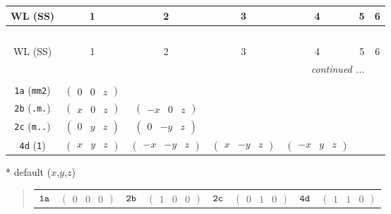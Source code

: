 \documentclass[fleqn,9pt,landscape]{jsarticle}
\begin{document}
\begin{center}
\renewcommand{\arraystretch}{1.2}
\begin{longtable}{ccccccc}
 \hline \hline
WL (SS) & 1 & 2 & 3 & 4 & 5 & 6 \\ \hline \endfirsthead

\multicolumn{6}{l}{\tablename\ \thetable{}} \\
 \hline \hline
WL (SS) & 1 & 2 & 3 & 4 & 5 & 6 \\ \hline \endhead

 \hline \hline
\multicolumn{6}{r}{\footnotesize\it continued ...} \\ \endfoot

 \hline \hline
\multicolumn{6}{r}{} \\ \endlastfoot

{\tt 1a} ({\tt mm2}) & $ \begin{pmatrix} 0 & 0 & z \end{pmatrix} $ & $  $ & $  $ & $  $ \\ \hline
{\tt 2b} ({\tt .m.}) & $ \begin{pmatrix} x & 0 & z \end{pmatrix} $ & $ \begin{pmatrix} - x & 0 & z \end{pmatrix} $ & $  $ & $  $ \\ \hline
{\tt 2c} ({\tt m..}) & $ \begin{pmatrix} 0 & y & z \end{pmatrix} $ & $ \begin{pmatrix} 0 & - y & z \end{pmatrix} $ & $  $ & $  $ \\ \hline
{\tt 4d} ({\tt 1}) & $ \begin{pmatrix} x & y & z \end{pmatrix} $ & $ \begin{pmatrix} - x & - y & z \end{pmatrix} $ & $ \begin{pmatrix} x & - y & z \end{pmatrix} $ & $ \begin{pmatrix} - x & y & z \end{pmatrix} $ \\
\end{longtable}
\end{center}
* default ($x$,$y$,$z$)
\begin{quote}
\begin{tabular}{cccccccc}
$ {\tt 1a} $ & $ \begin{pmatrix} 0 & 0 & 0 \end{pmatrix} $ & $ {\tt 2b} $ & $ \begin{pmatrix} 1 & 0 & 0 \end{pmatrix} $ & $ {\tt 2c} $ & $ \begin{pmatrix} 0 & 1 & 0 \end{pmatrix} $ & $ {\tt 4d} $ & $ \begin{pmatrix} 1 & 1 & 0 \end{pmatrix} $
\end{tabular}
\end{quote}
\end{document}
